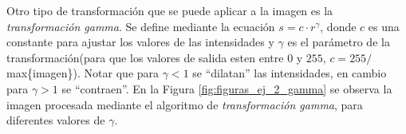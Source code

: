 \documentclass[11pt, twocolumn]{article}
\begin{document}
Otro tipo de transformación que se puede aplicar a la imagen es la \textit{transformación gamma}. Se define mediante la ecuación $s = c \cdot r^{\gamma}$, donde $c$ es una constante para ajustar los valores de las intensidades y $\gamma$ es el parámetro de la transformación(para que los valores de salida esten entre $0$ y $255$, $c = 255/$max\{imagen\}). Notar que para $\gamma < 1$ se ``dilatan'' las intensidades, en cambio para $\gamma > 1$ se ``contraen''. En la Figura \ref{fig:figuras_ej_2_gamma} se observa la imagen procesada mediante el algoritmo de \textit{transformación gamma}, para diferentes valores de $\gamma$.

\begin{figure}[H]
  \centering
  \hfill
  \hfill
  \hfill

\end{figure}
\end{document}

